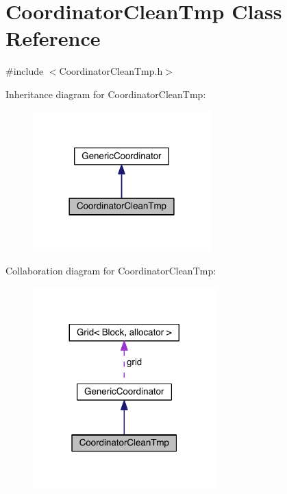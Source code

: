\hypertarget{class_coordinator_clean_tmp}{}\section{Coordinator\+Clean\+Tmp Class Reference}
\label{class_coordinator_clean_tmp}


{\ttfamily \#include $<$Coordinator\+Clean\+Tmp.\+h$>$}



Inheritance diagram for Coordinator\+Clean\+Tmp\+:\nopagebreak
\begin{figure}[H]
\begin{center}
\leavevmode
\includegraphics[width=194pt]{db/d5d/class_coordinator_clean_tmp__inherit__graph}
\end{center}
\end{figure}


Collaboration diagram for Coordinator\+Clean\+Tmp\+:\nopagebreak
\begin{figure}[H]
\begin{center}
\leavevmode
\includegraphics[width=200pt]{d5/d3c/class_coordinator_clean_tmp__coll__graph}
\end{center}
\end{figure}
